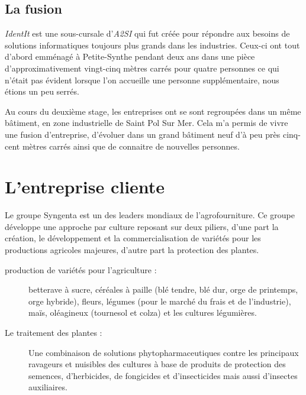 
\subsection{La fusion} %
\label{sub:La fusion}

\emph{IdentIt} est une sous-cursale d'\emph{A2SI} qui fut créée pour
répondre aux besoins de solutions informatiques toujours plus grands
dans les industries. Ceux-ci ont tout d'abord emménagé à Petite-Synthe
pendant deux ans dans une pièce d'approximativement vingt-cinq mètres
carrés pour quatre personnes ce qui n'était pas évident lorsque l'on
accueille une personne supplémentaire, nous étions un peu serrés.

Au cours du deuxième stage, les entreprises ont se sont regroupées dans
un même bâtiment, en zone industrielle de Saint Pol Sur Mer. Cela m'a
permis de vivre une \og fusion \fg{} d'entreprise, d'évoluer dans un
grand bâtiment neuf d'à peu près cinq-cent mètres carrés ainsi que de
connaitre de nouvelles personnes.



\section{L'entreprise cliente} %
\label{sec:L'entreprise cliente}

Le groupe Syngenta est un des leaders mondiaux de l’agrofourniture.  Ce
groupe développe une approche par culture reposant sur deux piliers,
d'une part la création, le développement et la commercialisation de
variétés pour les productions agricoles majeures, d'autre part la
protection des plantes.

\begin{description}

  \item[production de variétés pour l'agriculture :] betterave à sucre,
    céréales à paille (blé tendre, blé dur, orge de printemps, orge
    hybride), fleurs, légumes (pour le marché du frais et de
    l’industrie), maïs, oléagineux (tournesol et colza) et les cultures
    légumières.

  \item[Le traitement des plantes :] Une combinaison de solutions
    phytopharmaceutiques contre les principaux ravageurs et nuisibles
    des cultures à base de produits de protection des semences,
    d’herbicides, de fongicides et d’insecticides mais aussi d’insectes
    auxiliaires.

\end{description}


